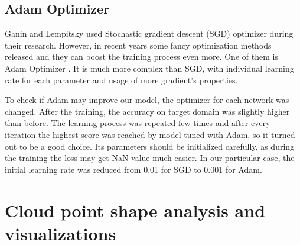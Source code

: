 \documentclass[shortabstract, inz, english]{iithesis}
\begin{document}
\subsection{Adam Optimizer}
Ganin and Lempitsky used Stochastic gradient descent (SGD) optimizer during their research. However, in recent years some fancy optimization methods released and they can boost the training process even more. One of them is Adam Optimizer \cite{adam}. It is much more complex than SGD, with individual learning rate for each parameter and usage of more gradient's properties. 
\par
To check if Adam may improve our model, the optimizer for each network was changed. After the training, the accuracy on target domain was slightly higher than before. The learning process was repeated few times and after every iteration the highest score was reached by model tuned with Adam, so it turned out to be a good choice. Its parameters should be initialized carefully, as during the training the loss may get NaN value much easier. In our particular case, the initial learning rate was reduced from 0.01 for SGD to 0.001 for Adam.

\section{Cloud point shape analysis and visualizations}
\end{document}
